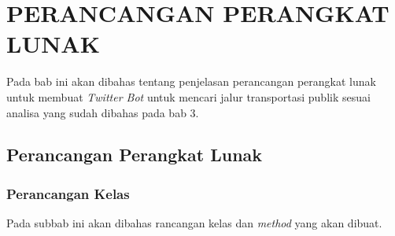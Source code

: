 \chapter{PERANCANGAN PERANGKAT LUNAK}
\label{chap:perancangan perangkat lunak}

Pada bab ini akan dibahas tentang penjelasan perancangan perangkat lunak untuk membuat \textit{Twitter Bot} untuk mencari jalur transportasi publik sesuai analisa yang sudah dibahas pada bab 3.

\section{Perancangan Perangkat Lunak}

\subsection{Perancangan Kelas}
Pada subbab ini akan dibahas rancangan kelas dan \textit{method} yang akan dibuat.

